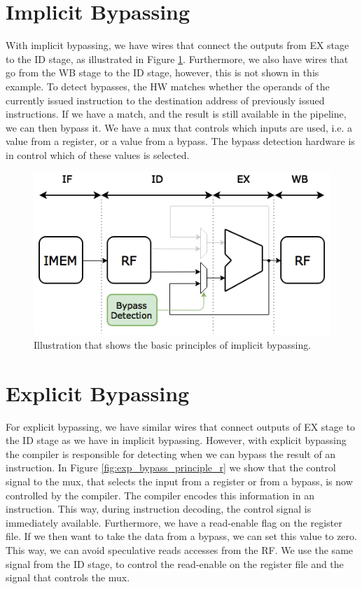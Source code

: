 \section{Implicit Bypassing}
With implicit bypassing, we have wires that connect the outputs from EX stage to the ID stage, as illustrated in Figure \ref{fig:impl_bypass_principle}. Furthermore, we also have wires that go from the WB stage to the ID stage, however, this is not shown in this example. To detect bypasses, the HW matches whether the operands of the currently issued instruction to the destination address of previously issued instructions. If we have a match, and the result is still available in the pipeline, we can then bypass it. We have a mux that controls which inputs are used, i.e. a value from a register, or a value from a bypass. The bypass detection hardware is in control which of these values is selected.

\begin{figure}[t]
\centering
\includegraphics[width=.5\textwidth]{figures/impl_bypassing_principle/03_implicit_bypassing_principle}
\caption{Illustration that shows the basic principles of implicit bypassing.}
\label{fig:impl_bypass_principle}
\end{figure}

\section{Explicit Bypassing}
For explicit bypassing, we have similar wires that connect outputs of EX stage to the ID stage as we have in implicit bypassing. However, with explicit bypassing the compiler is responsible for detecting when we can bypass the result of an instruction. In Figure \ref{fig:exp_bypass_principle_r} we show that the control signal to the mux, that selects the input from a register or from a bypass, is now controlled by the compiler. The compiler encodes this information in an instruction. This way, during instruction decoding, the control signal is immediately available. Furthermore, we have a read-enable flag on the register file. If we then want to take the data from a bypass, we can set this value to zero. This way, we can avoid speculative reads accesses from the RF. We use the same signal from the ID stage, to control the read-enable on the register file and the signal that controls the mux. 

